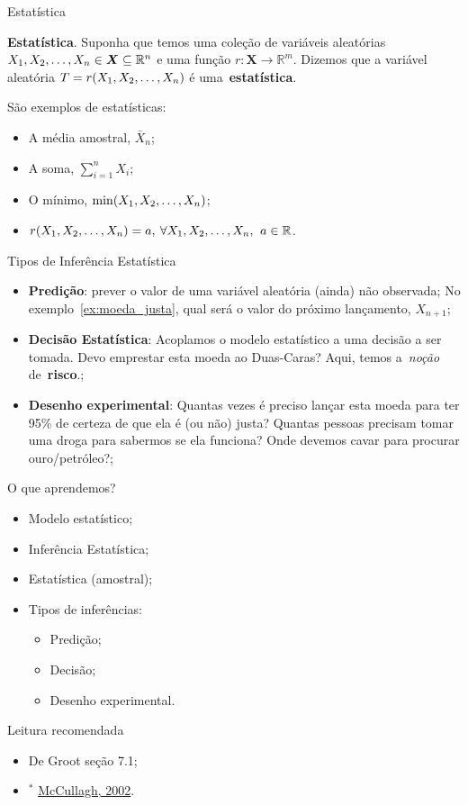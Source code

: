 \begin{frame}{Estatística}
\begin{defn}
 \textbf{Estatística}.
 Suponha que temos uma coleção de variáveis aleatórias $X_1, X_2, \ldots, X_n \in \boldsymbol X \subseteq \mathbb{R}^n$ e uma função $r: \boldsymbol X \to \mathbb{R}^m$.
 Dizemos que a variável aleatória $T = r(X_1, X_2, \ldots, X_n)$ é uma~\textbf{estatística}.
\end{defn}
São exemplos de estatísticas:
\begin{itemize}
 \item A média amostral, $\bar{X}_n$;
 \item A soma, $\sum_{i=1}^n X_i$;
 \item O mínimo, $\min(X_1, X_2, \ldots, X_n)$;
 \item $r(X_1, X_2, \ldots, X_n) = a, \: \forall X_1, X_2, \ldots, X_n, \: \, a \in \mathbb{R}$.
\end{itemize}  
\end{frame}
\begin{frame}{Tipos de Inferência Estatística}
\begin{itemize}
 \item \textbf{Predição}: prever o valor de uma variável aleatória (ainda) não observada; No exemplo~\ref{ex:moeda_justa}, qual será o valor do próximo lançamento, $X_{n+1}$;
 \item \textbf{Decisão Estatística}: Acoplamos o modelo estatístico a uma decisão a ser tomada. Devo emprestar esta moeda ao Duas-Caras? Aqui, temos a~\textit{noção} de~\textbf{risco}.;
 \item \textbf{Desenho experimental}: Quantas vezes é preciso lançar esta moeda para ter 95\% de certeza de que ela é (ou não) justa? Quantas pessoas precisam tomar uma droga para sabermos se ela funciona? Onde devemos cavar para procurar ouro/petróleo?;
\end{itemize}
\end{frame}
\begin{frame}{O que aprendemos?}
\begin{itemize}
 \item[\faLightbulbO] Modelo estatístico;
 \item[\faLightbulbO] Inferência Estatística;
 \item[\faLightbulbO] Estatística (amostral);
 \item[\faLightbulbO] Tipos de inferências:
 \begin{itemize}
  \item Predição;
  \item Decisão;
  \item Desenho experimental.
 \end{itemize}
\end{itemize}
\end{frame}
\begin{frame}{Leitura recomendada}
\begin{itemize}
 \item[\faBook] De Groot seção 7.1;
 \item[\faFilePdfO] $^\ast$ \href{https://projecteuclid.org/download/pdf_1/euclid.aos/1035844977}{McCullagh, 2002}.
\end{itemize} 
\end{frame}
